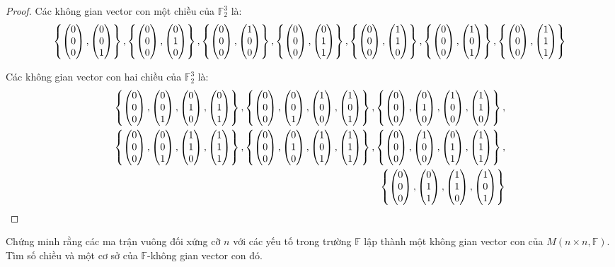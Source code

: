 \documentclass[class=linearalgebra,crop=false]{standalone}
\begin{document}
\begin{proof}
    Các không gian vector con một chiều của $\mathbb{F}^{3}_{2}$ là:
    \[
        \left\{
        \begin{pmatrix} 0 \\ 0 \\ 0 \end{pmatrix},
        \begin{pmatrix} 0 \\ 0 \\ 1 \end{pmatrix}
        \right\},
        \left\{
        \begin{pmatrix} 0 \\ 0 \\ 0 \end{pmatrix},
        \begin{pmatrix} 0 \\ 1 \\ 0 \end{pmatrix}
        \right\},
        \left\{
        \begin{pmatrix} 0 \\ 0 \\ 0 \end{pmatrix},
        \begin{pmatrix} 1 \\ 0 \\ 0 \end{pmatrix}
        \right\},
        \left\{
        \begin{pmatrix} 0 \\ 0 \\ 0 \end{pmatrix},
        \begin{pmatrix} 0 \\ 1 \\ 1 \end{pmatrix}
        \right\},
        \left\{
        \begin{pmatrix} 0 \\ 0 \\ 0 \end{pmatrix},
        \begin{pmatrix} 1 \\ 1 \\ 0 \end{pmatrix}
        \right\},
        \left\{
        \begin{pmatrix} 0 \\ 0 \\ 0 \end{pmatrix},
        \begin{pmatrix} 1 \\ 0 \\ 1 \end{pmatrix}
        \right\},
        \left\{
        \begin{pmatrix} 0 \\ 0 \\ 0 \end{pmatrix},
        \begin{pmatrix} 1 \\ 1 \\ 1 \end{pmatrix}
        \right\}
    \]
    \par Các không gian vector con hai chiều của $\mathbb{F}^{3}_{2}$ là:
    \[
        \begin{split}
            \left\{
            \begin{pmatrix} 0 \\ 0 \\ 0 \end{pmatrix},
            \begin{pmatrix} 0 \\ 0 \\ 1 \end{pmatrix},
            \begin{pmatrix} 0 \\ 1 \\ 0 \end{pmatrix},
            \begin{pmatrix} 0 \\ 1 \\ 1 \end{pmatrix}
            \right\},
            \left\{
            \begin{pmatrix} 0 \\ 0 \\ 0 \end{pmatrix},
            \begin{pmatrix} 0 \\ 0 \\ 1 \end{pmatrix},
            \begin{pmatrix} 1 \\ 0 \\ 0 \end{pmatrix},
            \begin{pmatrix} 1 \\ 0 \\ 1 \end{pmatrix}
            \right\},
            \left\{
            \begin{pmatrix} 0 \\ 0 \\ 0 \end{pmatrix},
            \begin{pmatrix} 0 \\ 1 \\ 0 \end{pmatrix},
            \begin{pmatrix} 1 \\ 0 \\ 0 \end{pmatrix},
            \begin{pmatrix} 1 \\ 1 \\ 0 \end{pmatrix}
            \right\},\\
            \left\{
            \begin{pmatrix} 0 \\ 0 \\ 0 \end{pmatrix},
            \begin{pmatrix} 0 \\ 0 \\ 1 \end{pmatrix},
            \begin{pmatrix} 1 \\ 1 \\ 0 \end{pmatrix},
            \begin{pmatrix} 1 \\ 1 \\ 1 \end{pmatrix}
            \right\},
            \left\{
            \begin{pmatrix} 0 \\ 0 \\ 0 \end{pmatrix},
            \begin{pmatrix} 0 \\ 1 \\ 0 \end{pmatrix},
            \begin{pmatrix} 1 \\ 0 \\ 1 \end{pmatrix},
            \begin{pmatrix} 1 \\ 1 \\ 1 \end{pmatrix}
            \right\},
            \left\{
            \begin{pmatrix} 0 \\ 0 \\ 0 \end{pmatrix},
            \begin{pmatrix} 1 \\ 0 \\ 0 \end{pmatrix},
            \begin{pmatrix} 0 \\ 1 \\ 1 \end{pmatrix},
            \begin{pmatrix} 1 \\ 1 \\ 1 \end{pmatrix}
            \right\}, \\
            \left\{
            \begin{pmatrix} 0 \\ 0 \\ 0 \end{pmatrix},
            \begin{pmatrix} 0 \\ 1 \\ 1 \end{pmatrix},
            \begin{pmatrix} 1 \\ 1 \\ 0 \end{pmatrix},
            \begin{pmatrix} 1 \\ 0 \\ 1 \end{pmatrix}
            \right\}
        \end{split}
    \]
\end{proof}

\begin{exercise}Chứng minh rằng các ma trận vuông đối xứng cỡ $n$ với các yếu tố trong trường $\mathbb{F}$ lập thành một không gian vector con của $M(n\times n,\mathbb{F})$. Tìm số chiều và một cơ sở của $\mathbb{F}$-không gian vector con đó.
\end{exercise}
\end{document}
